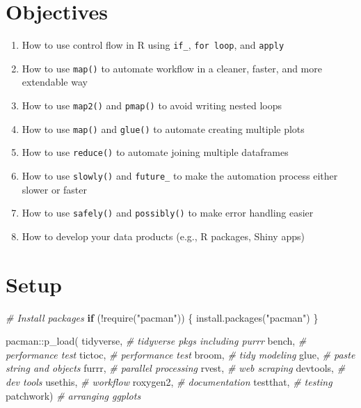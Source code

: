 \documentclass[
]{book}
\newenvironment{Shaded}{\begin{snugshade}}{\end{snugshade}}
\newcommand{\CommentTok}[1]{\textcolor[rgb]{0.56,0.35,0.01}{\textit{#1}}}
\newcommand{\ControlFlowTok}[1]{\textcolor[rgb]{0.13,0.29,0.53}{\textbf{#1}}}
\newcommand{\FunctionTok}[1]{\textcolor[rgb]{0.00,0.00,0.00}{#1}}
\newcommand{\NormalTok}[1]{#1}
\newcommand{\SpecialCharTok}[1]{\textcolor[rgb]{0.00,0.00,0.00}{#1}}
\newcommand{\StringTok}[1]{\textcolor[rgb]{0.31,0.60,0.02}{#1}}
\providecommand{\tightlist}{%
  \setlength{\itemsep}{0pt}\setlength{\parskip}{0pt}}
\begin{document}
\hypertarget{objectives}{%
\section{Objectives}\label{objectives}}

\begin{enumerate}
\def\labelenumi{\arabic{enumi}.}
\setcounter{enumi}{-1}
\tightlist
\item
  How to use control flow in R using \texttt{if\_}, \texttt{for\ loop}, and \texttt{apply}
\item
  How to use \texttt{map()} to automate workflow in a cleaner, faster, and more extendable way\\
\item
  How to use \texttt{map2()} and \texttt{pmap()} to avoid writing nested loops
\item
  How to use \texttt{map()} and \texttt{glue()} to automate creating multiple plots
\item
  How to use \texttt{reduce()} to automate joining multiple dataframes
\item
  How to use \texttt{slowly()} and \texttt{future\_} to make the automation process either slower or faster
\item
  How to use \texttt{safely()} and \texttt{possibly()} to make error handling easier
\item
  How to develop your data products (e.g., R packages, Shiny apps)
\end{enumerate}

\hypertarget{setup-3}{%
\section{Setup}\label{setup-3}}

\begin{Shaded}
\begin{Highlighting}[]
\CommentTok{\# Install packages}
\ControlFlowTok{if}\NormalTok{ (}\SpecialCharTok{!}\FunctionTok{require}\NormalTok{(}\StringTok{"pacman"}\NormalTok{)) \{}
  \FunctionTok{install.packages}\NormalTok{(}\StringTok{"pacman"}\NormalTok{)}
\NormalTok{\}}

\NormalTok{pacman}\SpecialCharTok{::}\FunctionTok{p\_load}\NormalTok{(}
\NormalTok{  tidyverse, }\CommentTok{\# tidyverse pkgs including purrr}
\NormalTok{  bench, }\CommentTok{\# performance test }
\NormalTok{  tictoc, }\CommentTok{\# performance test}
\NormalTok{  broom, }\CommentTok{\# tidy modeling}
\NormalTok{  glue, }\CommentTok{\# paste string and objects}
\NormalTok{  furrr, }\CommentTok{\# parallel processing}
\NormalTok{  rvest, }\CommentTok{\# web scraping}
\NormalTok{  devtools, }\CommentTok{\# dev tools }
\NormalTok{  usethis, }\CommentTok{\# workflow     }
\NormalTok{  roxygen2, }\CommentTok{\# documentation }
\NormalTok{  testthat, }\CommentTok{\# testing }
\NormalTok{  patchwork) }\CommentTok{\# arranging ggplots }
\end{Highlighting}
\end{Shaded}
\end{document}
